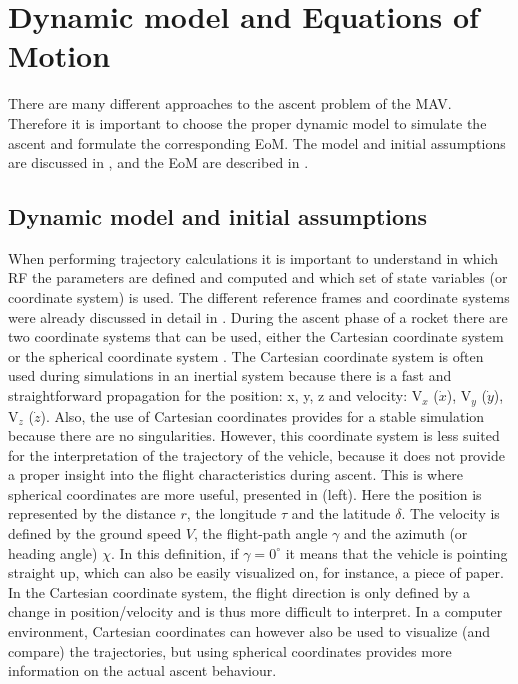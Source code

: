 

\section{Dynamic model and Equations of Motion}
\label{sec:launchEoM}
There are many different approaches to the ascent problem of the \ac{MAV}. Therefore it is important to choose the proper dynamic model to simulate the ascent and formulate the corresponding \ac{EoM}. The model and initial assumptions are discussed in , and the \ac{EoM} are described in .


\subsection{Dynamic model and initial assumptions}
\label{subsec:dynmodass_mav}
When performing trajectory calculations it is important to understand in which \ac{RF} the parameters are defined and computed and which set of state variables (or coordinate system) is used. The different reference frames and coordinate systems were already discussed in detail in . During the ascent phase of a rocket there are two coordinate systems that can be used, either the Cartesian coordinate system \cite{pagano2010thesis} or the spherical coordinate system \cite{fanning1996model,balesdent2011multidisciplinary,kesteren2013air}. 
The Cartesian coordinate system is often used during simulations in an inertial system because there is a fast and straightforward propagation for the position: x, y, z and velocity: V$_{x}$ ($\dot{x}$), V$_{y}$ ($\dot{y}$), V$_{z}$ ($\dot{z}$). Also, the use of Cartesian coordinates provides for a stable simulation because there are no singularities. However, this coordinate system is less suited for the interpretation of the trajectory of the vehicle, because it does not provide a proper insight into the flight characteristics during ascent. This is where spherical coordinates are more useful, presented in  (left). Here the position is represented by the distance $r$, the longitude $\tau$ and the latitude $\delta$. The velocity is defined by the ground speed $V$, the flight-path angle $\gamma$ and the azimuth (or heading angle) $\chi$. In this definition, if $\gamma=0^{\circ}$ it means that the vehicle is pointing straight up, which can also be easily visualized on, for instance, a piece of paper. In the Cartesian coordinate system, the flight direction is only defined by a change in position/velocity and is thus more difficult to interpret. In a computer environment, Cartesian coordinates can however also be used to visualize (and compare) the trajectories, but using spherical coordinates provides more information on the actual ascent behaviour. \\
